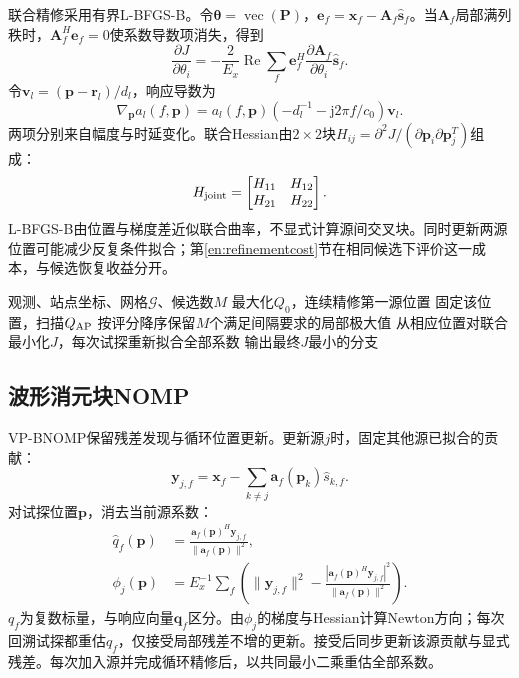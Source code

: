 \documentclass[a4paper,fleqn]{cas-sc}
\newcommand{\Rea}{\operatorname{Re}}
\begin{document}
联合精修采用有界L-BFGS-B\cite{Byrd1995}。令$\bm\theta=\operatorname{vec}(\bm P)$，$\bm e_f=\bm x_f-\bm A_f\widehat{\bm s}_f$。当$\bm A_f$局部满列秩时，$\bm A_f^H\bm e_f=0$使系数导数项消失，得到
\begin{equation}
\frac{\partial J}{\partial\theta_i}=-\frac{2}{E_x}\Rea\sum_f
 \bm e_f^H\frac{\partial\bm A_f}{\partial\theta_i}\widehat{\bm s}_f.
\label{en:gradient}
\end{equation}
令$\bm v_l=(\bm p-\bm r_l)/d_l$，响应导数为
\begin{equation}
\nabla_{\bm p}a_l(f,\bm p)=a_l(f,\bm p)
 (-d_l^{-1}-\mathrm j2\pi f/c_0)\bm v_l.
\end{equation}
两项分别来自幅度与时延变化。联合Hessian由$2\times2$块$H_{ij}=\partial^2J/(\partial\bm p_i\partial\bm p_j^T)$组成：
\begin{equation}
H_{\rm joint}=\begin{bmatrix}H_{11}&H_{12}\\H_{21}&H_{22}\end{bmatrix}.
\end{equation}
L-BFGS-B由位置与梯度差近似联合曲率，不显式计算源间交叉块。同时更新两源位置可能减少反复条件拟合；第\ref{en:refinementcost}节在相同候选下评价这一成本，与候选恢复收益分开。

\begin{algorithm}[H]
\caption{MCJ-AP}\label{en:algap}
\begin{algorithmic}[1]
\Require 观测、站点坐标、网格$\mathcal G$、候选数$M$
\State 最大化$Q_0$，连续精修第一源位置
\State 固定该位置，扫描$Q_{\rm AP}$
\State 按评分降序保留$M$个满足间隔要求的局部极大值
\State 从相应位置对联合最小化$J$，每次试探重新拟合全部系数
\EndFor
\State 输出最终$J$最小的分支
\end{algorithmic}
\end{algorithm}

\FloatBarrier
\subsection{波形消元块NOMP}
VP-BNOMP保留残差发现与循环位置更新\cite{Mamandipoor2016,Yang2022}。更新源$j$时，固定其他源已拟合的贡献：
\begin{equation}
\bm y_{j,f}=\bm x_f-\sum_{k\ne j}\bm a_f(\bm p_k)\widehat s_{k,f}.
\end{equation}
对试探位置$\bm p$，消去当前源系数：
\begin{align}
\widehat q_f(\bm p)&=\frac{\bm a_f(\bm p)^H\bm y_{j,f}}{\|\bm a_f(\bm p)\|^2},\\
\phi_j(\bm p)&=E_x^{-1}\sum_f\left(\|\bm y_{j,f}\|^2-
 \frac{|\bm a_f(\bm p)^H\bm y_{j,f}|^2}{\|\bm a_f(\bm p)\|^2}\right).
\label{en:local}
\end{align}
$q_f$为复数标量，与响应向量$\bm q_f$区分。由$\phi_j$的梯度与Hessian计算Newton方向；每次回溯试探都重估$q_f$，仅接受局部残差不增的更新。接受后同步更新该源贡献与显式残差。每次加入源并完成循环精修后，以共同最小二乘重估全部系数。
\end{document}
